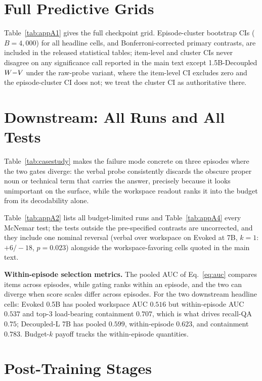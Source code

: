 \section{Full Predictive Grids}
\label{app:master}


Table~\ref{tab:appA1} gives the full checkpoint grid.
Episode-cluster bootstrap CIs ($B{=}4{,}000$) for all headline cells, and
Bonferroni-corrected primary contrasts, are included in the released
statistical tables; item-level and cluster
CIs never disagree on any significance call reported in the main text except
1.5B-Decoupled $W{-}V$ under the raw-probe variant, where the
item-level CI excludes zero and the episode-cluster CI does not; we treat the
cluster CI as authoritative there.

\section{Downstream: All Runs and All Tests}
\label{app:downstream}


Table~\ref{tab:casestudy} makes the failure mode concrete on three episodes
where the two gates diverge: the verbal probe consistently discards the
obscure proper noun or technical term that carries the answer, precisely
because it looks unimportant on the surface, while the workspace readout
ranks it into the budget from its decodability alone.

Table~\ref{tab:appA2} lists all budget-limited runs and
Table~\ref{tab:appA4} every McNemar test; the tests outside the pre-specified
contrasts are uncorrected, and they include one nominal reversal (verbal over
workspace on Evoked at 7B, $k{=}1$: $+6/-18$, $p{=}0.023$) alongside the
workspace-favoring cells quoted in the main text.

\textbf{Within-episode selection metrics.} The pooled AUC of
Eq.~\ref{eq:auc} compares items across episodes, while gating ranks within
an episode, and the two can diverge when score scales differ across episodes.
For the two downstream headline cells: Evoked 0.5B has pooled workspace AUC
$0.516$ but within-episode AUC $0.537$ and top-3 load-bearing containment
$0.707$, which is what drives recall-QA $0.75$; Decoupled-L 7B has pooled $0.599$,
within-episode $0.623$, and containment $0.783$. Budget-$k$ payoff tracks
the within-episode quantities.




\section{Post-Training Stages}
\label{app:olmo}


